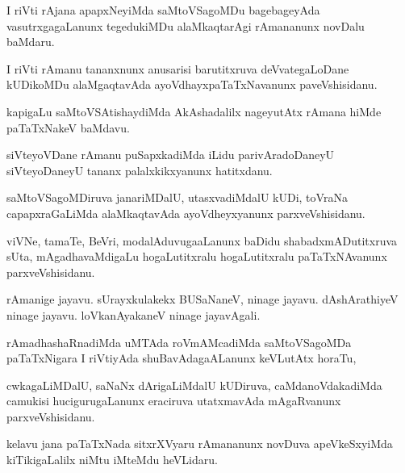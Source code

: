 \documentclass{article}
\begin{document}
\begin{mn}%
I riVti rAjana apapxNeyiMda saMtoVSagoMDu bagebageyAda vasutrxgagaLanunx tegedukiMDu 
alaMkaqtarAgi rAmananunx novDalu baMdaru.
\end{mn}

\begin{mn}%
I riVti rAmanu tananxnunx anusarisi barutitxruva deVvategaLoDane kUDikoMDu alaMgaqtavAda 
ayoVdhayxpaTaTxNavanunx paveVshisidanu.
\end{mn}

\begin{mn}%
kapigaLu saMtoVSAtishaydiMda AkAshadalilx nageyutAtx rAmana hiMde paTaTxNakeV baMdavu.
\end{mn}

\begin{mn}%
siVteyoVDane rAmanu puSapxkadiMda iLidu parivAradoDaneyU siVteyoDaneyU tananx 
palalxkikxyanunx hatitxdanu.
\end{mn}

\begin{mn}%
saMtoVSagoMDiruva janariMDalU, utasxvadiMdalU kUDi, toVraNa capapxraGaLiMda alaMkaqtavAda 
ayoVdheyxyanunx parxveVshisidanu.
\end{mn}

\begin{mn}%
viVNe, tamaTe, BeVri, modalAduvugaaLanunx baDidu shabadxmADutitxruva sUta, mAgadhavaMdigaLu 
hogaLutitxralu hogaLutitxralu paTaTxNAvanunx parxveVshisidanu.
\end{mn}

\begin{mn}%
rAmanige jayavu. sUrayxkulakekx BUSaNaneV, ninage jayavu. dAshArathiyeV ninage jayavu. 
loVkanAyakaneV ninage jayavAgali.
\end{mn}

\begin{mn}%
rAmadhashaRnadiMda uMTAda roVmAMcadiMda saMtoVSagoMDa paTaTxNigara I riVtiyAda 
shuBavAdagaALanunx keVLutAtx horaTu,
\end{mn}

\begin{mn}%
cwkagaLiMDalU, saNaNx dArigaLiMdalU kUDiruva, caMdanoVdakadiMda camukisi hucigurugaLanunx 
eraciruva utatxmavAda mAgaRvanunx parxveVshisidanu.
\end{mn}

\begin{mn}%
kelavu jana paTaTxNada sitxrXVyaru rAmananunx novDuva apeVkeSxyiMda kiTikigaLalilx niMtu 
iMteMdu heVLidaru.
\end{mn}
\end{document}
